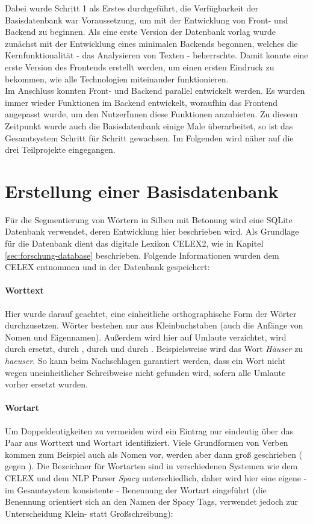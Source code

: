 Dabei wurde Schritt 1 als Erstes durchgeführt, die Verfügbarkeit der Basisdatenbank war Voraussetzung, um mit der Entwicklung von Front- und Backend zu beginnen. Als eine erste Version der Datenbank vorlag wurde zunächst mit der Entwicklung eines minimalen Backends begonnen, welches die Kernfunktionalität - das Analysieren von Texten - beherrschte. Damit konnte eine erste Version des Frontends erstellt werden, um einen ersten Eindruck zu bekommen, wie alle Technologien miteinander funktionieren.\\
Im Anschluss konnten Front- und Backend parallel entwickelt werden. Es wurden immer wieder Funktionen im Backend entwickelt, woraufhin das Frontend angepasst wurde, um den NutzerInnen diese Funktionen anzubieten. Zu diesem Zeitpunkt wurde auch die Basisdatenbank einige Male überarbeitet, so ist das Gesamtsystem Schritt für Schritt gewachsen. Im Folgenden wird näher auf die drei Teilprojekte eingegangen.

\section{Erstellung einer Basisdatenbank}
\label{sec:worddatabase}

Für die Segmentierung von Wörtern in Silben mit Betonung wird eine SQLite Datenbank verwendet, deren Entwicklung hier beschrieben wird. Als Grundlage für die Datenbank dient das digitale Lexikon CELEX2, wie in Kapitel \ref{sec:forschung-database} beschrieben. Folgende Informationen wurden dem CELEX entnommen und in der Datenbank gespeichert:

\paragraph{Worttext}
Hier wurde darauf geachtet, eine einheitliche orthographische Form der Wörter durchzusetzen. Wörter bestehen nur aus Kleinbuchstaben (auch die Anfänge von Nomen und Eigennamen). Außerdem wird hier auf Umlaute verzichtet,  wird durch  ersetzt,  durch ,  durch  und  durch . Beispielsweise wird das Wort \textit{Häuser} zu \textit{haeuser}. So kann beim Nachschlagen garantiert werden, dass ein Wort nicht wegen uneinheitlicher Schreibweise nicht gefunden wird, sofern alle Umlaute vorher ersetzt wurden.

\paragraph{Wortart}
Um Doppeldeutigkeiten zu vermeiden wird ein Eintrag nur eindeutig über das Paar aus Worttext und Wortart identifiziert. Viele Grundformen von Verben kommen zum Beispiel auch als Nomen vor, werden aber dann groß geschrieben ( gegen ). Die Bezeichner für Wortarten sind in verschiedenen Systemen wie dem CELEX und dem NLP Parser \textit{Spacy} unterschiedlich, daher wird hier eine eigene - im Gesamtsystem konsistente - Benennung der Wortart eingeführt (die Benennung orientiert sich an den Namen der Spacy Tags, verwendet jedoch zur Unterscheidung Klein- statt Großschreibung):

